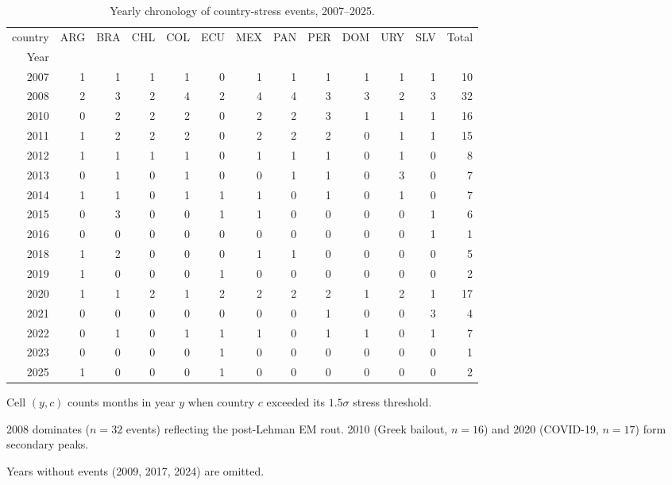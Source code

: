 \begin{table}[!htbp]
\centering
\footnotesize
\begin{threeparttable}
\caption{Yearly chronology of country-stress events, 2007--2025.}
\label{tab:yearly_chronology}
\begin{tabular}{rrrrrrrrrrrrr}
\toprule
country & ARG & BRA & CHL & COL & ECU & MEX & PAN & PER & DOM & URY & SLV & Total \\
Year &  &  &  &  &  &  &  &  &  &  &  &  \\
\midrule
2007 & 1 & 1 & 1 & 1 & 0 & 1 & 1 & 1 & 1 & 1 & 1 & 10 \\
2008 & 2 & 3 & 2 & 4 & 2 & 4 & 4 & 3 & 3 & 2 & 3 & 32 \\
2010 & 0 & 2 & 2 & 2 & 0 & 2 & 2 & 3 & 1 & 1 & 1 & 16 \\
2011 & 1 & 2 & 2 & 2 & 0 & 2 & 2 & 2 & 0 & 1 & 1 & 15 \\
2012 & 1 & 1 & 1 & 1 & 0 & 1 & 1 & 1 & 0 & 1 & 0 & 8 \\
2013 & 0 & 1 & 0 & 1 & 0 & 0 & 1 & 1 & 0 & 3 & 0 & 7 \\
2014 & 1 & 1 & 0 & 1 & 1 & 1 & 0 & 1 & 0 & 1 & 0 & 7 \\
2015 & 0 & 3 & 0 & 0 & 1 & 1 & 0 & 0 & 0 & 0 & 1 & 6 \\
2016 & 0 & 0 & 0 & 0 & 0 & 0 & 0 & 0 & 0 & 0 & 1 & 1 \\
2018 & 1 & 2 & 0 & 0 & 0 & 1 & 1 & 0 & 0 & 0 & 0 & 5 \\
2019 & 1 & 0 & 0 & 0 & 1 & 0 & 0 & 0 & 0 & 0 & 0 & 2 \\
2020 & 1 & 1 & 2 & 1 & 2 & 2 & 2 & 2 & 1 & 2 & 1 & 17 \\
2021 & 0 & 0 & 0 & 0 & 0 & 0 & 0 & 1 & 0 & 0 & 3 & 4 \\
2022 & 0 & 1 & 0 & 1 & 1 & 1 & 0 & 1 & 1 & 0 & 1 & 7 \\
2023 & 0 & 0 & 0 & 0 & 1 & 0 & 0 & 0 & 0 & 0 & 0 & 1 \\
2025 & 1 & 0 & 0 & 0 & 1 & 0 & 0 & 0 & 0 & 0 & 0 & 2 \\
\bottomrule
\end{tabular}
\begin{tablenotes}\footnotesize
\item Cell $(y,c)$ counts months in year $y$ when country $c$ exceeded its $1.5\sigma$ stress threshold.
\item 2008 dominates ($n=32$ events) reflecting the post-Lehman EM rout. 2010 (Greek bailout, $n=16$) and 2020 (COVID-19, $n=17$) form secondary peaks.
\item Years without events (2009, 2017, 2024) are omitted.
\end{tablenotes}
\end{threeparttable}
\end{table}
